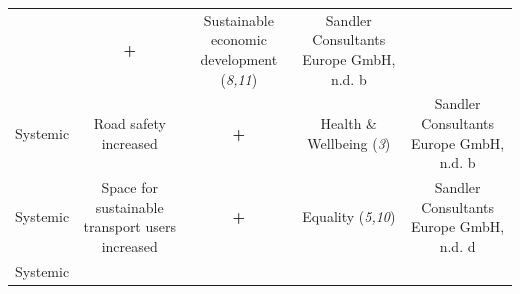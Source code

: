 \documentclass[
]{book}
\begin{document}
\begin{longtable}[]{@{}ccccc@{}}
\begin{minipage}[t]{0.16\columnwidth}
\end{minipage} & \begin{minipage}[t]{0.17\columnwidth}\centering
\textbf{+}\strut
\end{minipage} & \begin{minipage}[t]{0.17\columnwidth}\centering
Sustainable economic development (\emph{8,11})\strut
\end{minipage} & \begin{minipage}[t]{0.17\columnwidth}\centering
Sandler Consultants Europe GmbH, n.d. b\strut
\end{minipage}\tabularnewline
\begin{minipage}[t]{0.17\columnwidth}\centering
Systemic\strut
\end{minipage} & \begin{minipage}[t]{0.16\columnwidth}\centering
Road safety increased\strut
\end{minipage} & \begin{minipage}[t]{0.17\columnwidth}\centering
\textbf{+}\strut
\end{minipage} & \begin{minipage}[t]{0.17\columnwidth}\centering
Health \& Wellbeing (\emph{3})\strut
\end{minipage} & \begin{minipage}[t]{0.17\columnwidth}\centering
Sandler Consultants Europe GmbH, n.d. b\strut
\end{minipage}\tabularnewline
\begin{minipage}[t]{0.17\columnwidth}\centering
Systemic\strut
\end{minipage} & \begin{minipage}[t]{0.16\columnwidth}\centering
Space for sustainable transport users increased\strut
\end{minipage} & \begin{minipage}[t]{0.17\columnwidth}\centering
\textbf{+}\strut
\end{minipage} & \begin{minipage}[t]{0.17\columnwidth}\centering
Equality (\emph{5,10})\strut
\end{minipage} & \begin{minipage}[t]{0.17\columnwidth}\centering
Sandler Consultants Europe GmbH, n.d. d\strut
\end{minipage}\tabularnewline
\begin{minipage}[t]{0.17\columnwidth}\centering
Systemic\strut
\end{minipage} & \begin{minipage}[t]{0.16\columnwidth}\centering

\end{minipage}
\end{longtable}
\end{document}
